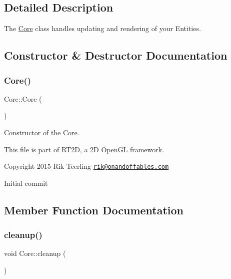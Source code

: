 \subsection{Detailed Description}
The \hyperlink{class_core}{Core} class handles updating and rendering of your Entities. 

\subsection{Constructor \& Destructor Documentation}
\mbox{\label{class_core_a14e63188e0aa7c4a6f72d5501384d1f9}} 
\subsubsection{\texorpdfstring{Core()}{Core()}}
{\footnotesize\ttfamily Core\+::\+Core (\begin{DoxyParamCaption}{ }\end{DoxyParamCaption})}



Constructor of the \hyperlink{class_core}{Core}. 

This file is part of R\+T2D, a 2D Open\+GL framework.


\begin{DoxyItemize}
\item Copyright 2015 Rik Teerling \href{mailto:rik@onandoffables.com}{\tt rik@onandoffables.\+com}
\begin{DoxyItemize}
\item Initial commit 
\end{DoxyItemize}
\end{DoxyItemize}

\subsection{Member Function Documentation}
\mbox{\label{class_core_ab58f3607dfedfe3b24dd2d6c20ed35ba}} 
\subsubsection{\texorpdfstring{cleanup()}{cleanup()}}
{\footnotesize\ttfamily void Core\+::cleanup (\begin{DoxyParamCaption}{ }\end{DoxyParamCaption})}



